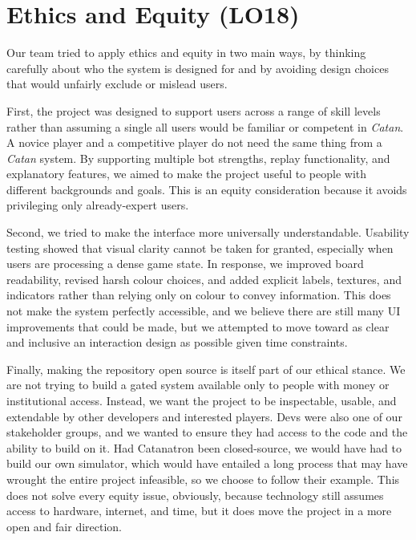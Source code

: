 \documentclass{article}
\begin{document}
\section{Ethics and Equity (LO18)}


Our team tried to apply ethics and equity in two main ways,
by thinking carefully about who the system is designed for and by avoiding design choices that would
unfairly exclude or mislead users.

First, the project was designed to support users across a range of skill levels rather than assuming a single
all users would be familiar or competent in \emph{Catan}.
A novice player and a competitive player do not need the same thing from a \emph{Catan} system.
By supporting multiple bot strengths, replay functionality, and explanatory features, we aimed to make the project
useful to people with different backgrounds and goals.
This is an equity consideration because it avoids privileging only already-expert users.

Second, we tried to make the interface more universally understandable.
Usability testing showed that visual clarity cannot be taken for granted, especially when users are processing
a dense game state.
In response, we improved board readability, revised harsh colour choices, and added explicit labels, textures,
and indicators rather than relying only on colour to convey information.
This does not make the system perfectly accessible, and we believe there are still many UI improvements
that could be made, but we attempted to move toward as clear and inclusive an interaction design as possible
given time constraints.

Finally, making the repository open source is itself part of our ethical stance.
We are not trying to build a gated system available only to people with money or institutional access.
Instead, we want the project to be inspectable, usable, and extendable by other developers and interested players.
Devs were also one of our stakeholder groups, and we wanted to ensure they had access to the code and the ability
to build on it.
Had Catanatron been closed-source, we would have had to build our own simulator, which would have entailed
a long process that may have wrought the entire project infeasible, so we choose to follow their example.
This does not solve every equity issue, obviously, because technology still assumes access to hardware,
internet, and time, but it does move the project in a more open and fair direction.
\end{document}
